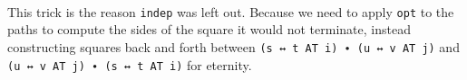 \begin{code}%
%
\>[2]\AgdaSpace{}%
\AgdaSymbol{:}\AgdaSpace{}%
\AgdaSymbol{\{}\AgdaSpace{}%
\AgdaSymbol{:}\AgdaSpace{}%
\AgdaSymbol{\}}\AgdaSpace{}%
\AgdaSpace{}%
\AgdaSymbol{(}\AgdaSpace{}%
\AgdaSymbol{:}\AgdaSpace{}%
\AgdaSymbol{)}\AgdaSpace{}%
\AgdaSpace{}%
\AgdaSpace{}%
\AgdaSymbol{(}\AgdaFunction{Σ[}\AgdaSpace{}%
\AgdaSpace{}%
\AgdaSpace{}%
\AgdaSpace{}%
\AgdaFunction{]}\AgdaSpace{}%
\AgdaSpace{}%
\AgdaSpace{}%
\AgdaSymbol{)}\<%
\\
%
\>[2]\AgdaSpace{}%
\AgdaSpace{}%
\AgdaSymbol{=}\AgdaSpace{}%
\AgdaSymbol{(}\AgdaSpace{}%
\AgdaOperator{\AgdaInductiveConstructor{,}}\AgdaSpace{}%
\AgdaSymbol{)}\AgdaSpace{}%
\AgdaOperator{\AgdaInductiveConstructor{,}}\AgdaSpace{}%
\AgdaSpace{}%
\AgdaSymbol{(\AgdaUnderscore{}}\AgdaSpace{}%
\AgdaOperator{\AgdaInductiveConstructor{,}}\AgdaSpace{}%
\AgdaSymbol{)}\AgdaSpace{}%
\AgdaSpace{}%
\AgdaSpace{}%
\AgdaSymbol{(}\AgdaSpace{}%
\AgdaSpace{}%
\AgdaOperator{\AgdaInductiveConstructor{,}}\AgdaSpace{}%
\AgdaSpace{}%
\AgdaSpace{}%
\AgdaSpace{}%
\AgdaSpace{}%
\AgdaSpace{}%
\AgdaSymbol{(}\AgdaOperator{\AgdaPrimitive{\textasciitilde{}}}\AgdaSpace{}%
\AgdaSpace{}%
\AgdaSpace{}%
\AgdaSymbol{)))}\<%
\end{code}
This trick is the reason \texttt{indep} was left out. Because we need to apply \texttt{opt} to
the paths to compute the sides of the square it would not terminate, instead constructing squares
back and forth between \texttt{(s ↔ t AT i) ∙ (u ↔ v AT j)} and \texttt{(u ↔ v AT j) ∙ (s ↔ t AT i)}
for eternity.

